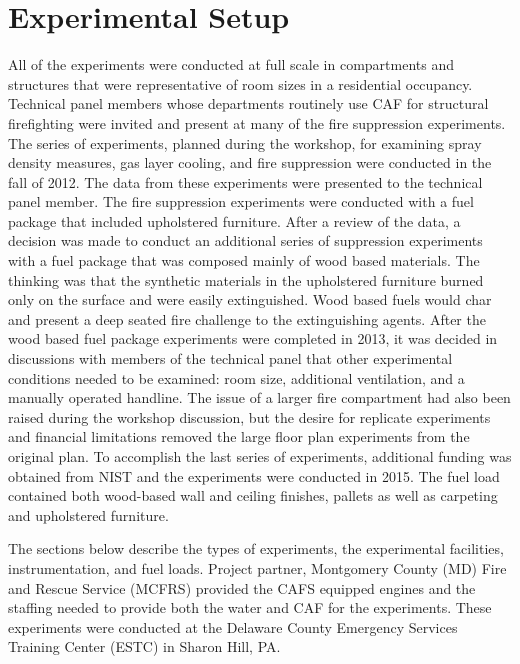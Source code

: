 \documentclass[12pt,oneside]{book}
\begin{document}
\chapter{Experimental Setup}

All of the experiments were conducted at full scale in compartments and structures that were representative of room sizes in a residential occupancy. Technical panel members whose departments routinely use CAF for structural firefighting were invited and present at many of the fire suppression experiments. The series of experiments, planned during the workshop, for examining spray density measures, gas layer cooling, and fire suppression were conducted in the fall of 2012. The data from these experiments were presented to the technical panel member. The fire suppression experiments were conducted with a fuel package that included upholstered furniture. After a review of the data, a decision was made to conduct an additional series of suppression experiments with a fuel package that was composed mainly of wood based materials. The thinking was that the synthetic materials in the upholstered furniture burned only on the surface and were easily extinguished. Wood based fuels would char and present a deep seated fire challenge to the extinguishing agents.  After the wood based fuel package experiments were completed in 2013, it was decided in discussions with members of the technical panel that other experimental conditions needed to be examined: room size, additional ventilation, and a manually operated handline. The issue of a larger fire compartment had also been raised during the workshop discussion, but the desire for replicate experiments and financial limitations removed the large floor plan experiments from the original plan. To accomplish the last series of experiments, additional funding was obtained from NIST and the experiments were conducted in 2015. The fuel load contained both wood-based wall and ceiling finishes, pallets as well as carpeting and upholstered furniture.  

The sections below describe the types of experiments, the experimental facilities, instrumentation, and fuel loads. Project partner, Montgomery County (MD) Fire and Rescue Service (MCFRS) provided the CAFS equipped engines and the staffing needed to provide both the water and CAF for the experiments. These experiments were conducted at the Delaware County Emergency Services Training Center (ESTC) in Sharon Hill, PA.
\end{document}
